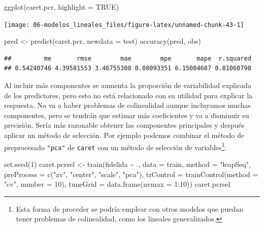 \documentclass[
]{book}
\newenvironment{Shaded}{\begin{snugshade}}{\end{snugshade}}
\newcommand{\AttributeTok}[1]{\textcolor[rgb]{0.77,0.63,0.00}{#1}}
\newcommand{\ConstantTok}[1]{\textcolor[rgb]{0.00,0.00,0.00}{#1}}
\newcommand{\DecValTok}[1]{\textcolor[rgb]{0.00,0.00,0.81}{#1}}
\newcommand{\FunctionTok}[1]{\textcolor[rgb]{0.00,0.00,0.00}{#1}}
\newcommand{\NormalTok}[1]{#1}
\newcommand{\OtherTok}[1]{\textcolor[rgb]{0.56,0.35,0.01}{#1}}
\newcommand{\SpecialCharTok}[1]{\textcolor[rgb]{0.00,0.00,0.00}{#1}}
\newcommand{\StringTok}[1]{\textcolor[rgb]{0.31,0.60,0.02}{#1}}
\theoremstyle{break}
\theoremstyle{definition}
\theoremstyle{definition}
\theoremstyle{definition}
\theoremstyle{definition}
\theoremstyle{remark}
\begin{document}
\begin{Shaded}
\begin{Highlighting}[]
\FunctionTok{ggplot}\NormalTok{(caret.pcr, }\AttributeTok{highlight =} \ConstantTok{TRUE}\NormalTok{)}
\end{Highlighting}
\end{Shaded}

\begin{center}\texttt{[image: 06-modelos\_lineales\_files/figure-latex/unnamed-chunk-43-1]} \end{center}

\begin{Shaded}
\begin{Highlighting}[]
\NormalTok{pred }\OtherTok{\textless{}{-}} \FunctionTok{predict}\NormalTok{(caret.pcr, }\AttributeTok{newdata =}\NormalTok{ test)}
\FunctionTok{accuracy}\NormalTok{(pred, obs)}
\end{Highlighting}
\end{Shaded}

\begin{verbatim}
##         me       rmse        mae        mpe       mape  r.squared 
## 0.54240746 4.39581553 3.46755308 0.08093351 6.15004687 0.81060798
\end{verbatim}

Al incluir más componentes se aumenta la proporción de variabilidad explicada de los predictores,
pero esto no está relacionado con su utilidad para explicar la respuesta.
No va a haber problemas de colinealidad aunque incluyamos muchas componentes, pero se tendrán que estimar más coeficientes y va a disminuir su precisión.
Sería más razonable obtener las componentes principales y después aplicar un método de selección.
Por ejemplo podemos combinar el método de preprocesado \texttt{"pca"} de \texttt{caret} con un método de selección de variables\footnote{Esta forma de proceder se podría emplear con otros modelos que puedan tener problemas de colinealidad, como los lineales generalizados.}:

\begin{Shaded}
\begin{Highlighting}[]
\FunctionTok{set.seed}\NormalTok{(}\DecValTok{1}\NormalTok{)}
\NormalTok{caret.pcrsel }\OtherTok{\textless{}{-}} \FunctionTok{train}\NormalTok{(fidelida }\SpecialCharTok{\textasciitilde{}}\NormalTok{ ., }\AttributeTok{data =}\NormalTok{ train, }\AttributeTok{method =} \StringTok{"leapSeq"}\NormalTok{,}
                   \AttributeTok{preProcess =} \FunctionTok{c}\NormalTok{(}\StringTok{"zv"}\NormalTok{, }\StringTok{"center"}\NormalTok{, }\StringTok{"scale"}\NormalTok{, }\StringTok{"pca"}\NormalTok{),     }
                   \AttributeTok{trControl =} \FunctionTok{trainControl}\NormalTok{(}\AttributeTok{method =} \StringTok{"cv"}\NormalTok{, }\AttributeTok{number =} \DecValTok{10}\NormalTok{),}
                   \AttributeTok{tuneGrid =} \FunctionTok{data.frame}\NormalTok{(}\AttributeTok{nvmax =} \DecValTok{1}\SpecialCharTok{:}\DecValTok{10}\NormalTok{))}
\NormalTok{caret.pcrsel}
\end{Highlighting}
\end{Shaded}
\end{document}
